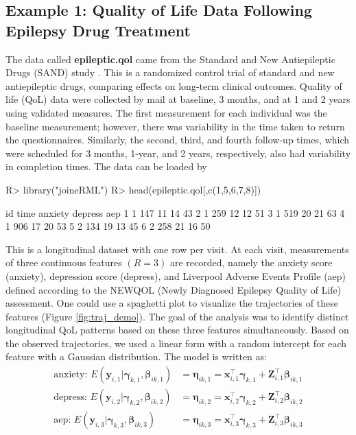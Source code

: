 \subsection{Example 1: Quality of Life Data Following Epilepsy Drug Treatment}
The data called \textbf{epileptic.qol} came from the Standard and New Antiepileptic Drugs (SAND) study \citep{Marson2007}. This is a randomized control trial of standard and new antiepileptic drugs, comparing effects on long-term clinical outcomes. Quality of life (QoL) data were collected by mail at baseline, 3 months, and at 1 and 2 years using validated measures. The first measurement for each individual was the baseline measurement; however, there was variability in the time taken to return the questionnaires. Similarly, the second, third, and fourth follow-up times, which were scheduled for 3 months, 1-year, and 2 years, respectively, also had variability in completion times. 
The data can be loaded by
\begin{example}
R> library("joineRML")
R> head(epileptic.qol[,c(1,5,6,7,8)])
\end{example}
\begin{example}
  id time anxiety depress aep
1  1  147      11      14  43
2  1  259      12      12  51
3  1  519      20      21  63
4  1  906      17      20  53
5  2  134      19      13  45
6  2  258      21      16  50
\end{example}
This is a longitudinal dataset with one row per visit. At each visit, measurements of three continuous features $(R = 3)$ are recorded, namely the anxiety score (anxiety), depression score (depress), and Liverpool Adverse Events Profile (aep) defined according to the NEWQOL (Newly Diagnosed Epilepsy Quality of Life) assessment. One could use a spaghetti plot to visualize the trajectories of these features (Figure \ref{fig:traj_demo}). The goal of the analysis was to identify distinct longitudinal QoL patterns based on these three features simultaneously. Based on the observed trajectories, we used a linear form with a random intercept for each feature with a Gaussian distribution. The model is written as: 
\begin{align*}
  \text{anxiety: }  E(\boldsymbol{y}_{i,1}|\boldsymbol{\gamma}_{k,1}, \boldsymbol{\beta}_{ik,1}) & = \boldsymbol{\eta}_{ik,1}  =   \boldsymbol{x}_{i,1}^\top\boldsymbol{\gamma}_{k,1} +  \boldsymbol{Z}_{i,1}^\top\boldsymbol{\beta}_{ik,1}  \\
  \text{depress: }    E(\boldsymbol{y}_{i,2}|\boldsymbol{\gamma}_{k,2}, \boldsymbol{\beta}_{ik,2}) & = \boldsymbol{\eta}_{ik,2}  =  \boldsymbol{x}_{i,2}^\top\boldsymbol{\gamma}_{k,2} +  \boldsymbol{Z}_{i,2}^\top\boldsymbol{\beta}_{ik,2} \\
  \text{aep: }   E(\boldsymbol{y}_{i,3}|\boldsymbol{\gamma}_{k,3},\boldsymbol{\beta}_{ik,3}) & =  \boldsymbol{\eta}_{ik,3} = \boldsymbol{x}_{i,3}^\top\boldsymbol{\gamma}_{k,3} +  \boldsymbol{Z}_{i,3}^\top\boldsymbol{\beta}_{ik,3}
\end{align*}
